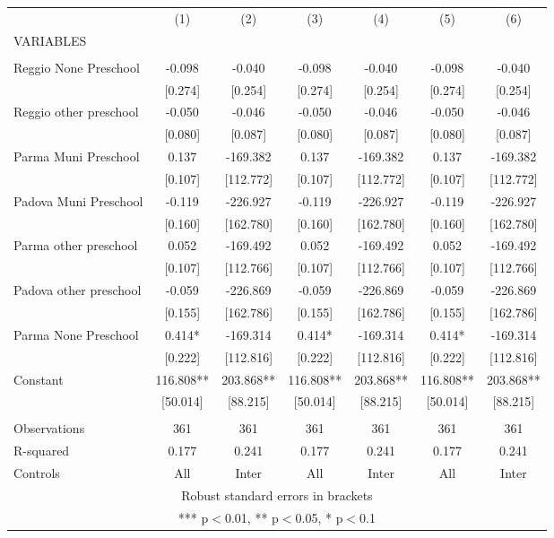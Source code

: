 \begin{tabular}{lcccccc} \hline
 & (1) & (2) & (3) & (4) & (5) & (6) \\
VARIABLES &  &  &  &  &  &  \\ \hline
 &  &  &  &  &  &  \\
Reggio None Preschool & -0.098 & -0.040 & -0.098 & -0.040 & -0.098 & -0.040 \\
 & [0.274] & [0.254] & [0.274] & [0.254] & [0.274] & [0.254] \\
Reggio other preschool & -0.050 & -0.046 & -0.050 & -0.046 & -0.050 & -0.046 \\
 & [0.080] & [0.087] & [0.080] & [0.087] & [0.080] & [0.087] \\
Parma Muni Preschool & 0.137 & -169.382 & 0.137 & -169.382 & 0.137 & -169.382 \\
 & [0.107] & [112.772] & [0.107] & [112.772] & [0.107] & [112.772] \\
Padova Muni Preschool & -0.119 & -226.927 & -0.119 & -226.927 & -0.119 & -226.927 \\
 & [0.160] & [162.780] & [0.160] & [162.780] & [0.160] & [162.780] \\
Parma other preschool & 0.052 & -169.492 & 0.052 & -169.492 & 0.052 & -169.492 \\
 & [0.107] & [112.766] & [0.107] & [112.766] & [0.107] & [112.766] \\
Padova other preschool & -0.059 & -226.869 & -0.059 & -226.869 & -0.059 & -226.869 \\
 & [0.155] & [162.786] & [0.155] & [162.786] & [0.155] & [162.786] \\
Parma None Preschool & 0.414* & -169.314 & 0.414* & -169.314 & 0.414* & -169.314 \\
 & [0.222] & [112.816] & [0.222] & [112.816] & [0.222] & [112.816] \\
Constant & 116.808** & 203.868** & 116.808** & 203.868** & 116.808** & 203.868** \\
 & [50.014] & [88.215] & [50.014] & [88.215] & [50.014] & [88.215] \\
 &  &  &  &  &  &  \\
Observations & 361 & 361 & 361 & 361 & 361 & 361 \\
R-squared & 0.177 & 0.241 & 0.177 & 0.241 & 0.177 & 0.241 \\
 Controls & All & Inter & All & Inter & All & Inter \\ \hline
\multicolumn{7}{c}{ Robust standard errors in brackets} \\
\multicolumn{7}{c}{ *** p$<$0.01, ** p$<$0.05, * p$<$0.1} \\
\end{tabular}
